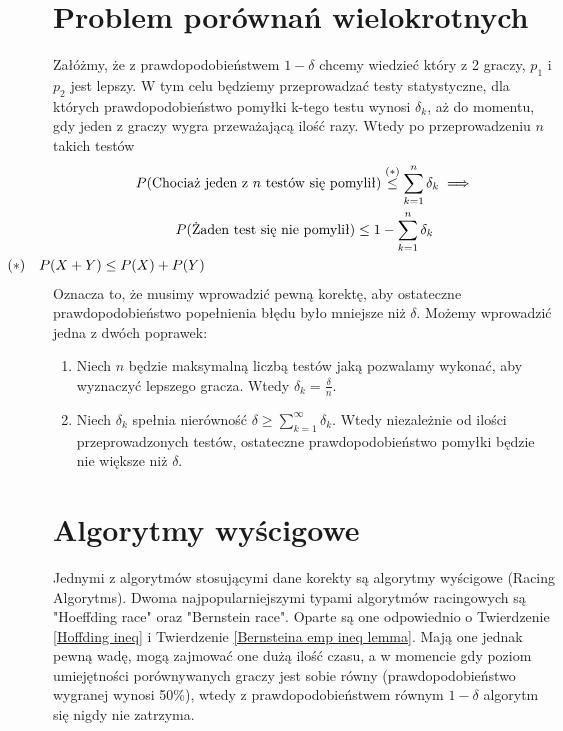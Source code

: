 \documentclass[inzynierska]{pwr_wmat_praca_dyplomowa}
\theoremstyle{plain}
\numberwithin{theorem}{chapter}
\theoremstyle{definition}
\numberwithin{theorem}{chapter}
\begin{document}
	\section{Problem porównań wielokrotnych}
	Załóżmy, że z prawdopodobieństwem $1-\delta$ chcemy wiedzieć który z 2 graczy, $p_1$ i $p_2$ jest lepszy. W tym
	celu będziemy przeprowadzać testy statystyczne, dla których
	prawdopodobieństwo pomyłki k-tego testu wynosi $\delta_k$, aż do momentu, gdy jeden z graczy wygra przeważającą ilość razy. Wtedy po przeprowadzeniu $n$ takich testów
	\begin{gather*}
		P(\text{Chociaż jeden z $n$ testów się pomylił}) \overset{(*)}{\le} \sum_{k=1}^n \delta_k \implies  \\
	P(\text{Żaden test się nie pomylił}) \le 1 - \sum_{k=1}^n \delta_k \\
	\hspace*{-10cm} (*) \quad P(X+Y) \le P(X) + P(Y) 
	\end{gather*} 
	Oznacza to, że musimy wprowadzić pewną korektę, aby
	ostateczne prawdopodobieństwo popełnienia błędu było
	mniejsze niż $\delta$.
	Możemy wprowadzić jedna z dwóch poprawek:

	\begin{enumerate}[label=\thesection.\arabic*]
		\item \label{korekta 1} Niech $n$ będzie maksymalną liczbą testów jaką pozwalamy wykonać, aby wyznaczyć lepszego
		gracza. Wtedy $\delta_k=\frac{\delta}{n}$.
		\item \label{korekta 2} Niech $\delta_k$ spełnia nierówność $ \delta \ge \displaystyle\sum_{k = 1}^{\infty}\delta_k$. Wtedy niezależnie od
		ilości przeprowadzonych testów, ostateczne
		prawdopodobieństwo pomyłki będzie nie większe niż
		$\delta$.
	\end{enumerate}

	\section{Algorytmy wyścigowe}
	Jednymi z algorytmów stosującymi dane korekty są algorytmy wyścigowe
	(Racing \\Algorytms). Dwoma najpopularniejszymi typami algorytmów racingowych są "Hoeﬀding race" oraz "Bernstein race".
	Oparte są one odpowiednio o Twierdzenie \ref{Hoffding ineq} i Twierdzenie \ref{Bernsteina emp ineq lemma}. Mają one jednak pewną wadę, mogą zajmować one dużą ilość czasu, a w momencie gdy poziom umiejętności porównywanych graczy jest sobie równy (prawdopodobieństwo wygranej wynosi 50\%), wtedy z prawdopodobieństwem równym $1-\delta$ algorytm się nigdy nie zatrzyma.
	
\end{document}
